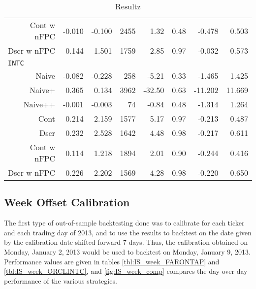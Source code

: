\begin{table}
\begin{tabular}{@{} *{8}{r} @{}}
Cont w nFPC & -0.010 & -0.100 & 2455 & 1.32 & 0.48 & -0.478 & 0.503 \\ 
Dscr w nFPC & 0.144 & 1.501 & 1759 & 2.85 & 0.97 & -0.032 & 0.573 \\[2ex]
\multicolumn{8}{l}{\texttt{INTC}} \\
Naive & -0.082 & -0.228 & 258 & -5.21 & 0.33 & -1.465 & 1.425 \\ 
Naive+ & 0.365 & 0.134 & 3962 & -32.50 & 0.63 & -11.202 & 11.669 \\ 
Naive++ & -0.001 & -0.003 & 74 & -0.84 & 0.48 & -1.314 & 1.264 \\ 
Cont & 0.214 & 2.159 & 1577 & 5.17 & 0.97 & -0.213 & 0.487 \\ 
Dscr & 0.232 & 2.528 & 1642 & 4.48 & 0.98 & -0.217 & 0.611 \\ 
Cont w nFPC & 0.114 & 1.218 & 1894 & 2.01 & 0.90 & -0.244 & 0.416 \\ 
Dscr w nFPC &  0.226 & 2.202 & 1569 & 4.28 & 0.98 & -0.220 & 0.650 \\ 
\bottomrule
\end{tabular}
\caption{Resultz}
\label{tbl:IS_sameday}
\end{table}


\FloatBarrier
\subsection{Week Offset Calibration}
The first type of out-of-sample backtesting done was to calibrate for each ticker and each trading day of 2013, and to use the results to backtest on the date given by the calibration date shifted forward 7 days. Thus, the calibration obtained on Monday, January 2, 2013 would be used to backtest on Monday, January 9, 2013. Performance values are given in tables \autoref{tbl:IS_week_FARONTAP} and \autoref{tbl:IS_week_ORCLINTC}, and \autoref{fig:IS_week_comp} compares the day-over-day performance of the various strategies. 

